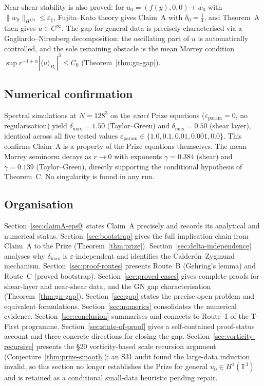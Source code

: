 \documentclass[11pt]{article}
\theoremstyle{definition}
\theoremstyle{remark}
\newcommand{\T}{\mathbb{T}}
\newcommand{\dlt}{\delta}
\newcommand{\eps}{\varepsilon}
\begin{document}
\medskip

Near-shear stability is also proved: for $u_0=(f(y),0,0)+w_0$ with
$\|w_0\|_{H^{1/2}}\leq\eps_1$, Fujita--Kato theory gives
Claim~A with $\dlt_0=\tfrac{1}{4}$, and Theorem~A then gives $u\in C^\infty$.
The gap for general data is precisely characterised via a Gagliardo--Nirenberg
decomposition: the oscillating part of $u$ is automatically controlled, and the
sole remaining obstacle is the mean Morrey condition
$\sup r^{-1+\alpha}|\langle u\rangle_{B_r}|^3\leq C_0$
(Theorem~\ref{thm:gn-gap}).

\subsection{Numerical confirmation}
\label{sec:intro-numerics}

Spectral simulations at $N=128^3$ on the \emph{exact} Prize equations
($\eps_{\mathrm{param}}=0$, no regularisation) yield $\dlt_{\max}=1.50$
(Taylor--Green) and $\dlt_{\max}=0.50$ (shear layer), identical across all
five tested values $\eps_{\mathrm{param}}\in\{1.0,0.1,0.01,0.001,0.0\}$.
This confirms Claim~A is a property of the Prize equations themselves.
The mean Morrey seminorm decays as $r\to 0$ with exponents $\gamma=0.384$
(shear) and $\gamma=0.139$ (Taylor--Green), directly supporting the
conditional hypothesis of Theorem~C.  No singularity is found in any run.

\subsection{Organisation}
\label{sec:intro-organisation}

Section~\ref{sec:claimA-eps0} states Claim~A precisely and records its
analytical and numerical status.
Section~\ref{sec:bootstrap} gives the full implication chain from Claim~A to
the Prize (Theorem~\ref{thm:prize}).
Section~\ref{sec:delta-independence} analyses why $\dlt_{\max}$ is
$\eps$-independent and identifies the Calder\'on--Zygmund mechanism.
Section~\ref{sec:proof-routes} presents Route~B (Gehring's lemma) and
Route~C (proved bootstrap).
Section~\ref{sec:proved-cases} gives complete proofs for shear-layer and
near-shear data, and the GN gap characterisation (Theorem~\ref{thm:gn-gap}).
Section~\ref{sec:gap} states the precise open problem and equivalent
formulations.
Section~\ref{sec:numerics} consolidates the numerical evidence.
Section~\ref{sec:conclusion} summarises and connects to Route~1 of the
T-First programme.
Section~\ref{sec:state-of-proof} gives a self-contained proof-status account
and three concrete directions for closing the gap.
Section~\ref{sec:vorticity-recursive} presents the §20 vorticity-based scale
recursion argument (Conjecture~\ref{thm:prize-smooth}); an S31 audit found the
large-data induction invalid, so this section no longer establishes the Prize
for general $u_0\in H^1(\T^3)$ and is retained as a conditional small-data
heuristic pending repair.
\end{document}
